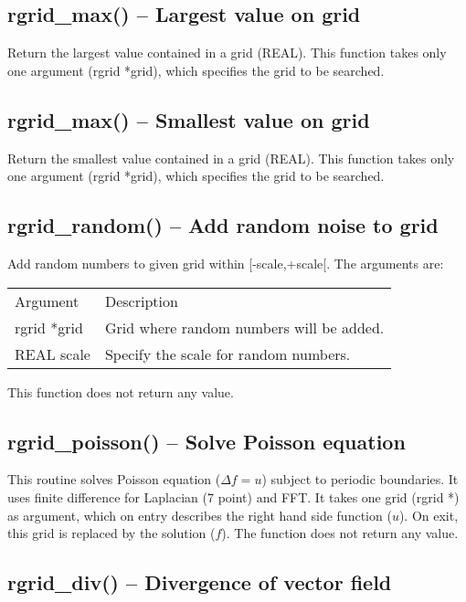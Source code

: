 \documentclass[12pt,letterpaper]{report}
\begin{document}
\subsection{rgrid\_max() -- Largest value on grid}

Return the largest value contained in a grid (REAL). This function takes only one argument (rgrid *grid), which specifies the grid to be searched.

\subsection{rgrid\_max() -- Smallest value on grid}

Return the smallest value contained in a grid (REAL). This function takes only one argument (rgrid *grid), which specifies the grid to be searched.

\subsection{rgrid\_random() -- Add random noise to grid}

Add random numbers to given grid within [-scale,+scale[. The arguments are:
\begin{longtable}{p{} p{}}
Argument & Description\\
\cline{1-2}
rgrid *grid & Grid where random numbers will be added.\\
REAL scale & Specify the scale for random numbers.\\
\end{longtable}
\noindent
This function does not return any value. 

\subsection{rgrid\_poisson() -- Solve Poisson equation}

This routine solves Poisson equation ($\Delta f = u$) subject to periodic boundaries. It
uses finite difference for Laplacian (7 point) and FFT. It takes one grid (rgrid *) as argument, which on entry describes the right hand side function ($u$). On exit, this grid is replaced by the solution ($f$). The function does not return any value.

\subsection{rgrid\_div() -- Divergence of vector field}
\end{document}
